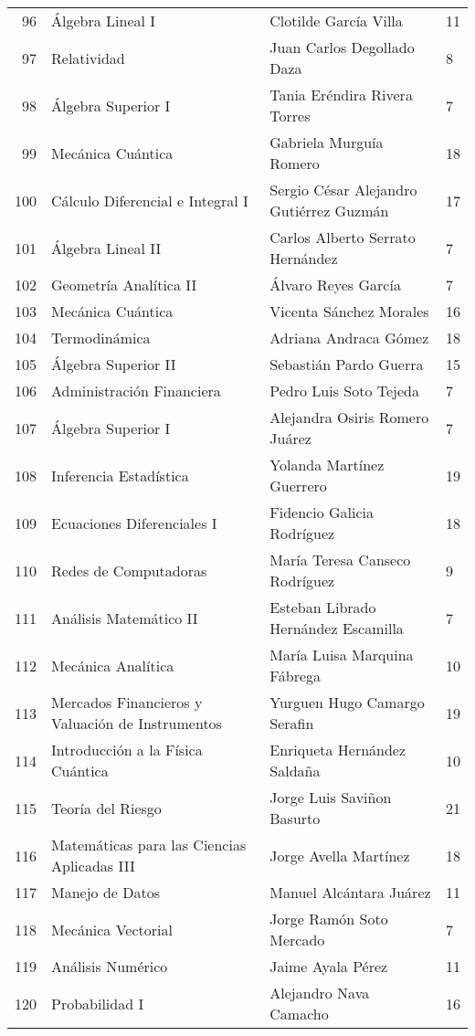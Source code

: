 \begin{table}[ht]
\begin{tabular}{rlll}
  96 & Álgebra Lineal I & Clotilde García Villa & 11 \\ 
  97 & Relatividad & Juan Carlos Degollado Daza & 8 \\ 
  98 & Álgebra Superior I & Tania Eréndira Rivera Torres & 7 \\ 
  99 & Mecánica Cuántica & Gabriela Murguía Romero & 18 \\ 
  100 & Cálculo Diferencial e Integral I & Sergio César Alejandro Gutiérrez Guzmán & 17 \\ 
  101 & Álgebra Lineal II & Carlos Alberto Serrato Hernández & 7 \\ 
  102 & Geometría Analítica II & Álvaro Reyes García & 7 \\ 
  103 & Mecánica Cuántica & Vicenta Sánchez Morales & 16 \\ 
  104 & Termodinámica & Adriana Andraca Gómez & 18 \\ 
  105 & Álgebra Superior II & Sebastián Pardo Guerra & 15 \\ 
  106 & Administración Financiera & Pedro Luis Soto Tejeda & 7 \\ 
  107 & Álgebra Superior I & Alejandra Osiris Romero Juárez & 7 \\ 
  108 & Inferencia Estadística & Yolanda Martínez Guerrero & 19 \\ 
  109 & Ecuaciones Diferenciales I & Fidencio Galicia Rodríguez & 18 \\ 
  110 & Redes de Computadoras & María Teresa Canseco Rodríguez & 9 \\ 
  111 & Análisis Matemático II & Esteban Librado Hernández Escamilla & 7 \\ 
  112 & Mecánica Analítica & María Luisa Marquina Fábrega & 10 \\ 
  113 & Mercados Financieros y Valuación de Instrumentos & Yurguen Hugo Camargo Serafin & 19 \\ 
  114 & Introducción a la Física Cuántica & Enriqueta Hernández Saldaña & 10 \\ 
  115 & Teoría del Riesgo & Jorge Luis Saviñon Basurto & 21 \\ 
  116 & Matemáticas para las Ciencias Aplicadas III & Jorge Avella Martínez & 18 \\ 
  117 & Manejo de Datos & Manuel Alcántara Juárez & 11 \\ 
  118 & Mecánica Vectorial & Jorge Ramón Soto Mercado & 7 \\ 
  119 & Análisis Numérico & Jaime Ayala Pérez & 11 \\ 
  120 & Probabilidad I & Alejandro Nava Camacho & 16 \\ 

\end{tabular}
\end{table}
